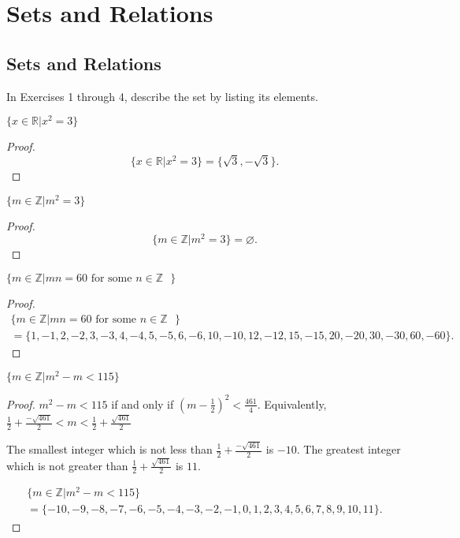 \chapter{Sets and Relations}

\section{Sets and Relations}

In Exercises 1 through 4, describe the set by listing its elements.

\begin{exercise}
    $\{ x\in\mathbb{R} \vert x^{2} = 3 \}$
\end{exercise}

\begin{proof}
    \[
        \{ x\in\mathbb{R} \vert x^{2} = 3 \} = \{ \sqrt{3}, -\sqrt{3} \}.
    \]
\end{proof}

\begin{exercise}
    $\{ m\in\mathbb{Z} \vert m^{2} = 3 \}$
\end{exercise}

\begin{proof}
    \[
        \{ m\in\mathbb{Z} \vert m^{2} = 3 \} = \varnothing.
    \]
\end{proof}

\begin{exercise}
    $\{ m\in\mathbb{Z} \vert mn = 60 \text{ for some $n\in\mathbb{Z}$ } \}$
\end{exercise}

\begin{proof}
    \begin{multline*}
        \{ m\in\mathbb{Z} \vert mn = 60 \text{\ for some $n\in\mathbb{Z}$ } \} \\
        = \{ 1, -1, 2, -2, 3, -3, 4, -4, 5, -5, 6, -6, 10, -10, 12, -12, 15, -15, 20, -20, 30, -30, 60, -60 \}.
    \end{multline*}
\end{proof}

\begin{exercise}
    $\{ m\in\mathbb{Z} \vert m^{2} - m < 115 \}$
\end{exercise}

\begin{proof}
    $m^{2} - m < 115$ if and only if ${\left(m - \frac{1}{2}\right)}^{2} < \frac{461}{4}$. Equivalently, $\frac{1}{2} + \frac{-\sqrt{461}}{2} < m < \frac{1}{2} + \frac{\sqrt{461}}{2}$

    The smallest integer which is not less than $\frac{1}{2} + \frac{-\sqrt{461}}{2}$ is $-10$. The greatest integer which is not greater than $\frac{1}{2} + \frac{\sqrt{461}}{2}$ is $11$.

    \begin{multline*}
        \{ m\in\mathbb{Z} \vert m^{2} - m < 115 \} \\
        = \{ -10, -9, -8, -7, -6, -5, -4, -3, -2, -1, 0, 1, 2, 3, 4, 5, 6, 7, 8, 9, 10, 11 \}.
    \end{multline*}
\end{proof}

